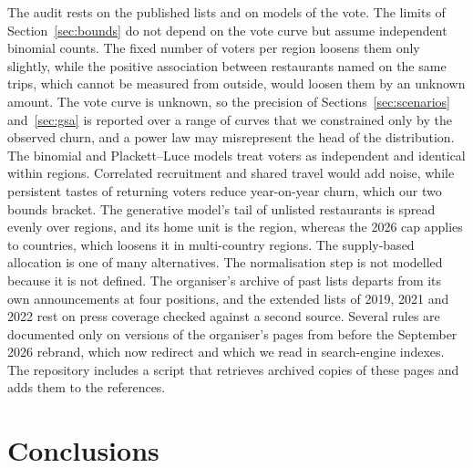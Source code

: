 \documentclass[11pt,a4paper]{article}
\begin{document}
The audit rests on the published lists and on models of the vote. The limits of Section~\ref{sec:bounds} do not depend on the vote curve but assume independent binomial counts. The fixed number of voters per region loosens them only slightly, while the positive association between restaurants named on the same trips, which cannot be measured from outside, would loosen them by an unknown amount. The vote curve is unknown, so the precision of Sections~\ref{sec:scenarios} and~\ref{sec:gsa} is reported over a range of curves that we constrained only by the observed churn, and a power law may misrepresent the head of the distribution. The binomial and Plackett--Luce models treat voters as independent and identical within regions. Correlated recruitment and shared travel would add noise, while persistent tastes of returning voters reduce year-on-year churn, which our two bounds bracket. The generative model's tail of unlisted restaurants is spread evenly over regions, and its home unit is the region, whereas the 2026 cap applies to countries, which loosens it in multi-country regions. The supply-based allocation is one of many alternatives. The normalisation step is not modelled because it is not defined. The organiser's archive of past lists departs from its own announcements at four positions, and the extended lists of 2019, 2021 and 2022 rest on press coverage checked against a second source. Several rules are documented only on versions of the organiser's pages from before the September 2026 rebrand, which now redirect and which we read in search-engine indexes. The repository includes a script that retrieves archived copies of these pages and adds them to the references.

\section{Conclusions}\label{sec:conclusions}
\end{document}
